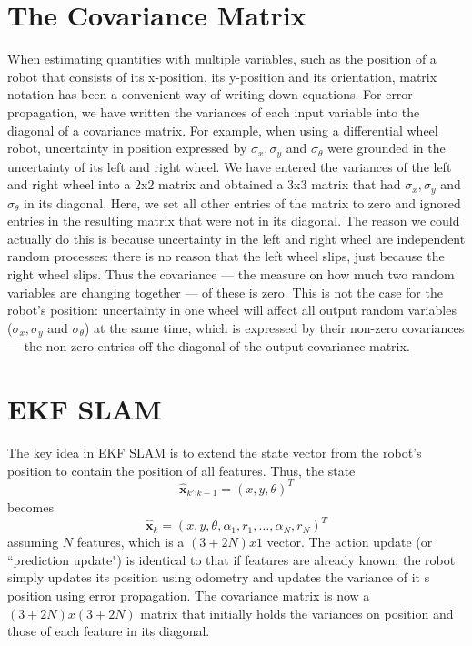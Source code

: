 \section{The Covariance Matrix}
When estimating quantities with multiple variables, such as the position of a robot that consists of its x-position, its y-position and its orientation, matrix notation has been a convenient way of writing down equations. For error propagation, we have written the variances of each input variable into the diagonal of a covariance matrix. For example, when using a differential wheel robot, uncertainty in position expressed by $ \sigma_x, \sigma_y$ and $ \sigma_{\theta}$ were grounded in the uncertainty of its left and right wheel. We have entered the variances of the left and right wheel into a 2x2 matrix and obtained a 3x3 matrix that had $ \sigma_x, \sigma_y$ and $ \sigma_{\theta}$ in its diagonal. Here, we set all other entries of the matrix to zero and ignored entries in the resulting matrix that were not in its diagonal. The reason we could actually do this is because uncertainty in the left and right wheel are independent random processes: there is no reason that the left wheel slips, just because the right wheel slips.  Thus the covariance --- the measure on how much two random variables are changing together --- of these is zero. This is not the case for the robot's position: uncertainty in one wheel will affect all output random variables ($ \sigma_x, \sigma_y$ and $ \sigma_{\theta}$) at the same time, which is expressed by their non-zero covariances --- the non-zero entries off the diagonal of the output covariance matrix.

\section{EKF SLAM}\label{sec:ekfslam}\label{sec:ekf}
The key idea in EKF SLAM is to extend the state vector from the robot's position to contain the position of all features. Thus, the state
\begin{equation}
\hat{\boldsymbol{x}}_{k'|k-1}=(x,y,\theta)^T
\end{equation}
becomes
\begin{equation}
\hat{\boldsymbol{x}}_{k}=(x,y,\theta,\alpha_1,r_1,\ldots,\alpha_N,r_N)^T
\end{equation}
assuming $ N$ features, which is a $(3+2N) x1$ vector. The action update (or ``prediction update") is identical to that if features are already known; the robot simply updates its position using odometry and updates the variance of it s position using error propagation. The covariance matrix is now a $(3+2N)x(3+2N)$ matrix that initially holds the variances on position and those of each feature in its diagonal.

